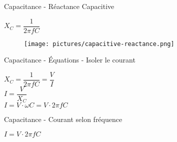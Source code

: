 \begin{frame}{Capacitance - Réactance Capacitive}
    \begin{center}
        \Large{
            $X_C = \dfrac{1}{2 \pi f C}$
        }
        \vspace{15pt}
        \begin{figure}
            \centering
            \texttt{[image: pictures/capacitive-reactance.png]}
        \end{figure}
    \end{center}
\end{frame}

\begin{frame}{Capacitance - Équations - Isoler le courant}
    \begin{center}
        \Large{
            $X_C = \dfrac{1}{2 \pi f C} = \dfrac{V}{I}$\\
            \vspace{15pt}
            $I = \dfrac{V}{X_C}$\\
            \vspace{5pt}
            $I = V \cdot \omega C = V \cdot 2 \pi f C$\\
        }
    \end{center}
\end{frame}

\begin{frame}{Capacitance - Courant selon fréquence}
    \begin{center}
        \Large{
            $I = V \cdot 2 \pi f C$
        }
        \vspace{15pt}
        \begin{figure}
            \centering
        \end{figure}
    \end{center}
\end{frame}






